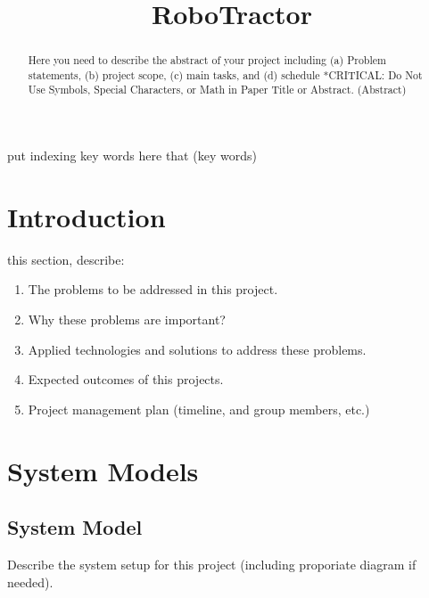 \documentclass[conference,12pt]{IEEEtran}
\begin{document}
%
\title{RoboTractor}
\author{
\and
{}
\and
{}
}
\maketitle


\begin{abstract}
    Here you need to describe the abstract of your project including (a) Problem statements, (b) project scope, (c) main tasks, and (d) schedule  *CRITICAL:  Do Not Use Symbols, Special Characters, or Math in Paper Title or Abstract. (Abstract)
\end{abstract}

\begin{IEEEkeywords}
    put indexing key words here that  (key words)
\end{IEEEkeywords}

\section{Introduction}
  this section, describe:
\begin{enumerate}
    \item The problems to be addressed in this project.
    \item Why these problems are important?
    \item Applied technologies and solutions to address these problems.
    \item Expected outcomes of this projects.
    \item Project management plan (timeline, and group members, etc.)
\end{enumerate}
\section{System Models}

\subsection{System Model}
Describe the system setup for this project (including proporiate diagram if needed).
\end{document}
